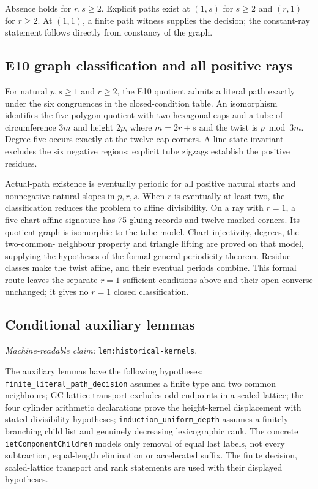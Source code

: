 \documentclass[11pt]{amsart}
\newcommand{\record}[1]{\nolinkurl{#1}}
\newcommand{\claimid}[1]{\par\nopagebreak\noindent\textit{Machine-readable claim:} \record{#1}.\par}
\theoremstyle{definition}\newtheorem{definition}{Definition}
\begin{document}
Absence holds for $r,s\ge2$. Explicit paths exist at $(1,s)$ for
$s\ge2$ and $(r,1)$ for $r\ge2$. At $(1,1)$, a finite path witness
supplies the decision; the constant-ray statement follows directly
from constancy of the graph.

\subsection{E10 graph classification and all positive rays}\label{sec:e10-formal}
For natural $p,s\ge1$ and $r\ge2$, the E10 quotient admits a literal
path exactly under the six congruences in the closed-condition table.
An isomorphism identifies the five-polygon quotient with two hexagonal
caps and a tube of circumference $3m$ and height $2p$, where $m=2r+s$
and the twist is $p\bmod3m$. Degree five occurs exactly at the twelve
cap corners. A line-state invariant excludes the six negative regions;
explicit tube zigzags establish the positive residues.

Actual-path existence is eventually periodic for all positive natural
starts and nonnegative natural slopes in $p,r,s$. When $r$ is eventually
at least two, the classification reduces the problem to affine
divisibility. On a ray with $r=1$, a five-chart affine signature has
75 gluing records and twelve marked corners. Its quotient graph is
isomorphic to the tube model. Chart injectivity, degrees, the two-common-
neighbour property and triangle lifting are proved on that model,
supplying the hypotheses of the formal general periodicity theorem.
Residue classes make the twist affine, and their eventual periods combine.
This formal route leaves the separate $r=1$ sufficient conditions above
and their open converse unchanged; it gives no $r=1$ closed classification.

\subsection{Conditional auxiliary lemmas}\label{sec:historical-formal}
\label{lem:historical-kernels}\claimid{lem:historical-kernels}
The auxiliary lemmas have the following hypotheses:
\record{finite_literal_path_decision} assumes a finite type and two
common neighbours; GC lattice transport excludes odd endpoints in a
scaled lattice; the four cylinder arithmetic declarations prove the
height-kernel displacement with stated divisibility hypotheses;
\record{induction_uniform_depth} assumes a finitely branching child
list and genuinely decreasing lexicographic rank. The concrete
\record{ietComponentChildren} models only removal of equal last labels,
not every subtraction, equal-length elimination or accelerated suffix.
The finite decision, scaled-lattice transport and rank statements
are used with their displayed hypotheses.
\end{document}
